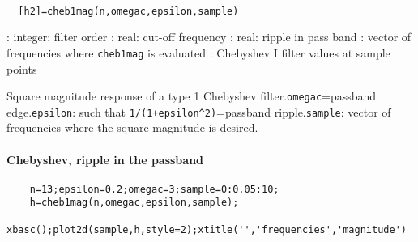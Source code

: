 
\begin{mandesc}
   \\ %
\end{mandesc}
\begin{calling_sequence}
\begin{verbatim}
  [h2]=cheb1mag(n,omegac,epsilon,sample)  
\end{verbatim}
\end{calling_sequence}
\begin{parameters}
  \begin{varlist}
    : integer: filter order
    : real: cut-off frequency
    : real: ripple in pass band
    : vector of frequencies where \verb!cheb1mag! is evaluated
    : Chebyshev I filter values at sample points
  \end{varlist}
\end{parameters}
\begin{mandescription}
  Square magnitude response of a type 1 Chebyshev filter.\verb!omegac!=passband
  edge.\verb!epsilon!: such that \verb!1/(1+epsilon^2)!=passband
  ripple.\verb!sample!: vector of frequencies where the square magnitude is
  desired.
\end{mandescription}
\begin{examples}
\paragraph{Chebyshev, ripple in the passband}
  \begin{Verbatim}
    n=13;epsilon=0.2;omegac=3;sample=0:0.05:10;
    h=cheb1mag(n,omegac,epsilon,sample);
    xbasc();plot2d(sample,h,style=2);xtitle('','frequencies','magnitude')
  \end{Verbatim}
\end{examples}
\begin{manseealso}
\end{manseealso}
